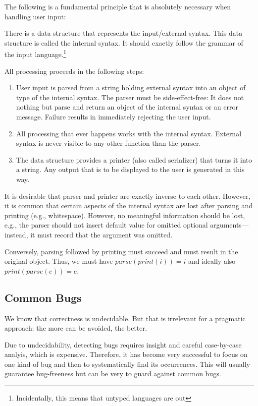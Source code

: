The following is a fundamental principle that is absolutely necessary when handling user input:
\begin{compactitem}
 \item There is a data structure that represents the input/external syntax.
 This data structure is called the internal syntax.
 It should exactly follow the grammar of the input language.\footnote{Incidentally, this means that untyped languages are out}
 \item All processing proceeds in the following steps:
 \begin{enumerate}
 \item User input is parsed from a string holding external syntax into an object of type of the internal syntax.
  The parser must be side-effect-free: It does not nothing but parse and return an object of the internal syntax or an error message.
  Failure results in immediately rejecting the user input.
  \item All processing that ever happens works with the internal syntax.
  External syntax is never visible to any other function than the parser.
  \item The data structure provides a printer (also called serializer) that turns it into a string.
  Any output that is to be displayed to the user is generated in this way.
 \end{enumerate}
\end{compactitem}

It is desirable that parser and printer are exactly inverse to each other.
However, it is common that certain aspects of the internal syntax are lost after parsing and printing (e.g., whitespace).
However, no meaningful information should be lost, e.g., the parser should not insert default value for omitted optional arguments---instead, it must record that the argument was omitted.

Conversely, parsing followed by printing must succeed and must result in the original object.
Thus, we must have $parse(print(i))=i$ and ideally also $print(parse(e))=e$.
 
\subsection{Common Bugs}

We know that correctness is undecidable.
But that is irrelevant for a pragmatic approach: the more can be avoided, the better.

Due to undecidability, detecting bugs requires insight and careful case-by-case analyis, which is expensive.
Therefore, it has become very successful to focus on one kind of bug and then to systematically find its occurrences.
This will usually guarantee bug-freeness but can be very to guard against common bugs.

